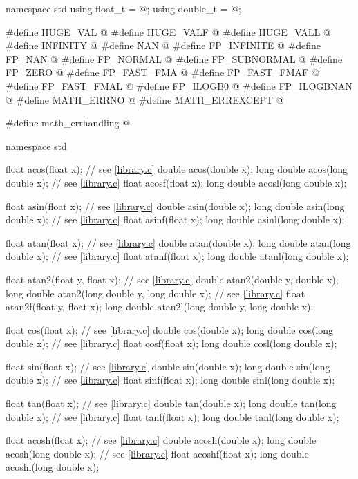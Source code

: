 \begin{codeblock}
namespace std {
  using float_t = @\seebelow@;
  using double_t = @\seebelow@;
}

#define HUGE_VAL @\seebelow@
#define HUGE_VALF @\seebelow@
#define HUGE_VALL @\seebelow@
#define INFINITY @\seebelow@
#define NAN @\seebelow@
#define FP_INFINITE @\seebelow@
#define FP_NAN @\seebelow@
#define FP_NORMAL @\seebelow@
#define FP_SUBNORMAL @\seebelow@
#define FP_ZERO @\seebelow@
#define FP_FAST_FMA @\seebelow@
#define FP_FAST_FMAF @\seebelow@
#define FP_FAST_FMAL @\seebelow@
#define FP_ILOGB0 @\seebelow@
#define FP_ILOGBNAN @\seebelow@
#define MATH_ERRNO @\seebelow@
#define MATH_ERREXCEPT @\seebelow@

#define math_errhandling @\seebelow@

namespace std {
  float acos(float x);  // see \ref{library.c}
  double acos(double x);
  long double acos(long double x);  // see \ref{library.c}
  float acosf(float x);
  long double acosl(long double x);

  float asin(float x);  // see \ref{library.c}
  double asin(double x);
  long double asin(long double x);  // see \ref{library.c}
  float asinf(float x);
  long double asinl(long double x);

  float atan(float x);                  // see \ref{library.c}
  double atan(double x);
  long double atan(long double x);      // see \ref{library.c}
  float atanf(float x);
  long double atanl(long double x);

  float atan2(float y, float x);        // see \ref{library.c}
  double atan2(double y, double x);
  long double atan2(long double y, long double x);  // see \ref{library.c}
  float atan2f(float y, float x);
  long double atan2l(long double y, long double x);

  float cos(float x);                   // see \ref{library.c}
  double cos(double x);
  long double cos(long double x);       // see \ref{library.c}
  float cosf(float x);
  long double cosl(long double x);

  float sin(float x);                   // see \ref{library.c}
  double sin(double x);
  long double sin(long double x);       // see \ref{library.c}
  float sinf(float x);
  long double sinl(long double x);

  float tan(float x);                   // see \ref{library.c}
  double tan(double x);
  long double tan(long double x);       // see \ref{library.c}
  float tanf(float x);
  long double tanl(long double x);

  float acosh(float x);                 // see \ref{library.c}
  double acosh(double x);
  long double acosh(long double x);     // see \ref{library.c}
  float acoshf(float x);
  long double acoshl(long double x);

}
\end{codeblock}

